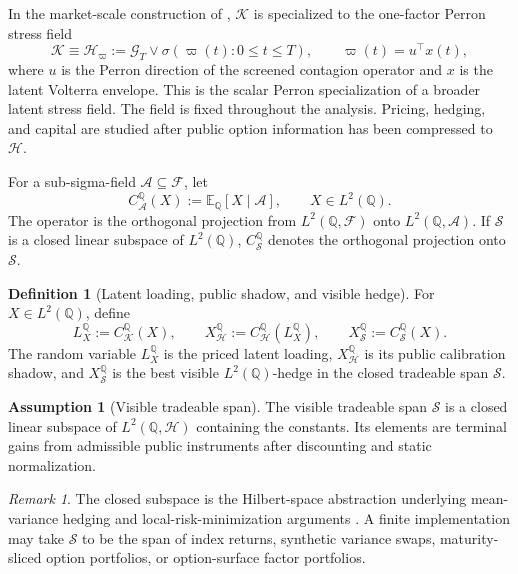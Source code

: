 \documentclass[11pt,a4paper]{amsart}
\theoremstyle{plain}
\theoremstyle{definition}
\newtheorem{definition}[theorem]{Definition}
\newtheorem{assumption}[theorem]{Assumption}
\theoremstyle{remark}
\newtheorem{remark}[theorem]{Remark}
\newcommand{\QQ}{\mathbb{Q}}
\newcommand{\EE}{\mathbb{E}}
\newcommand{\cA}{\mathcal{A}}
\newcommand{\cF}{\mathcal{F}}
\newcommand{\cG}{\mathcal{G}}
\newcommand{\cH}{\mathcal{H}}
\newcommand{\cK}{\mathcal{K}}
\newcommand{\cS}{\mathcal{S}}
\begin{document}
In the market-scale construction of \cite{vidal2026market,vidal2026compression},
\(\cK\) is specialized to the one-factor Perron stress field
\[
        \cK\equiv \cH_\varpi
        :=
        \cG_T\vee\sigma(\varpi(t):0\le t\le T),
        \qquad
        \varpi(t)=u^\top x(t),
\]
where \(u\) is the Perron direction of the screened contagion operator and \(x\) is the latent
Volterra envelope.  This is the scalar Perron specialization of a broader latent stress field.
The field is fixed throughout the analysis.  Pricing, hedging, and capital are studied after public
option information has been compressed to \(\cH\).

For a sub-sigma-field \(\cA\subseteq\cF\), let
\[
        C_{\cA}^{\QQ}(X):=\EE_\QQ[X\mid \cA],
        \qquad X\in L^2(\QQ).
\]
The operator is the orthogonal projection from \(L^2(\QQ,\cF)\) onto
\(L^2(\QQ,\cA)\).  If \(\cS\) is a closed linear subspace of \(L^2(\QQ)\),
\(C_{\cS}^{\QQ}\) denotes the orthogonal projection onto \(\cS\).

\begin{definition}[Latent loading, public shadow, and visible hedge]\label{def:loading-shadow-hedge}
For \(X\in L^2(\QQ)\), define
\[
        L_X^\QQ:=C_{\cK}^{\QQ}(X),
        \qquad
        X_{\cH}^{\QQ}:=C_{\cH}^{\QQ}(L_X^\QQ),
        \qquad
        X_{\cS}^{\QQ}:=C_{\cS}^{\QQ}(X).
\]
The random variable \(L_X^\QQ\) is the priced latent loading, \(X_{\cH}^{\QQ}\) is its public
calibration shadow, and \(X_{\cS}^{\QQ}\) is the best visible \(L^2(\QQ)\)-hedge in the closed
tradeable span \(\cS\).
\end{definition}

\begin{assumption}[Visible tradeable span]\label{ass:visible-span}
The visible tradeable span \(\cS\) is a closed linear subspace of \(L^2(\QQ,\cH)\) containing the
constants.  Its elements are terminal gains from admissible public instruments after discounting
and static normalization.
\end{assumption}

\begin{remark}
The closed subspace is the Hilbert-space abstraction underlying mean-variance hedging and
local-risk-minimization arguments
\cite{follmerSondermann1986,follmerSchweizer1991,schweizer1992meanVariance}.  A finite
implementation may take \(\cS\) to be the span of index returns, synthetic variance swaps,
maturity-sliced option portfolios, or option-surface factor portfolios.
\end{remark}
\end{document}
